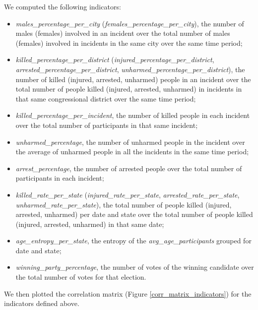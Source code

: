 \documentclass[10pt,a4paper]{report}
\begin{document}
We computed the following indicators:
\begin{itemize}
	\item \textit{males\_percentage\_per\_city} (\textit{females\_percentage\_per\_city}), the number of males (females) involved in an incident over the total number of males (females) involved in incidents in the same city over the same time period;
	\item \textit{killed\_percentage\_per\_district} (\textit{injured\_percentage\_per\_district}, \textit{arrested\_percentage\_per\_district}, \textit{unhar\-med\_percentage\_per\_district}), the number of killed (injured, arrested, unharmed) people in an incident over the total number of people killed (injured, arrested, unharmed) in incidents in that same congressional district over the same time period;
	\item \textit{killed\_percentage\_per\_incident}, the number of killed people in each incident over the total number of participants in that same incident;
	\item \textit{unharmed\_percentage}, the number of unharmed people in the incident over the average of unharmed people in all the incidents in the same time period;
	\item \textit{arrest\_percentage}, the number of arrested people over the total number of participants in each incident;
	\item \textit{killed\_rate\_per\_state} (\textit{injured\_rate\_per\_state}, \textit{arrested\_rate\_per\_state}, \textit{unharmed\_rate\_per\_state}), the total number of people killed (injured, arrested, unharmed) per date and state over the total number of people killed (injured, arrested, unharmed) in that same date;
	\item \textit{age\_entropy\_per\_state}, the entropy of the \textit{avg\_age\_participants} grouped for date and state;
	\item \textit{winning\_party\_percentage}, the number of votes of the winning candidate over the total number of votes for that election.
\end{itemize}

We then plotted the correlation matrix (Figure \ref{corr_matrix_indicators}) for the indicators defined above.
\end{document}
